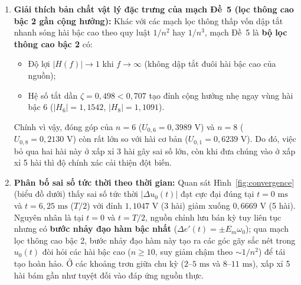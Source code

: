 \begin{enumerate}
    \item \textbf{Giải thích bản chất vật lý đặc trưng của mạch Đề~5 (lọc thông cao bậc 2 gần cộng hưởng):}
    Khác với các mạch lọc thông thấp vốn dập tắt nhanh sóng hài bậc cao theo quy luật $1/n^2$ hay $1/n^3$, mạch Đề~5 là \textbf{bộ lọc thông cao bậc 2} có:
    \begin{itemize}
        \item Độ lợi $|H(f)| \to 1$ khi $f \to \infty$ (không dập tắt đuôi hài bậc cao của nguồn);
        \item Hệ số tắt dần $\zeta = 0{,}498 < 0{,}707$ tạo đỉnh cộng hưởng nhẹ ngay vùng hài bậc 6 ($|H_6| = 1{,}1542$, $|H_8| = 1{,}1091$).
    \end{itemize}
    Chính vì vậy, đóng góp của $n = 6$ ($U_{0,6} = 0{,}3989\text{ V}$) và $n = 8$ ($U_{0,8} = 0{,}2130\text{ V}$) còn rất lớn so với hài cơ bản ($U_{0,1} = 0{,}6239\text{ V}$). Do đó, việc bỏ qua hai hài này ở xấp xỉ 3 hài gây sai số lớn, còn khi đưa chúng vào ở xấp xỉ 5 hài thì độ chính xác cải thiện đột biến.

    \item \textbf{Phân bố sai số tức thời theo thời gian:}
    Quan sát Hình~\ref{fig:convergence} (biểu đồ dưới) thấy sai số tức thời $|\Delta u_0(t)|$ đạt cực đại đúng tại $t = 0\text{ ms}$ và $t = 6{,}25\text{ ms}$ ($T/2$) với đỉnh $1{,}1047\text{ V}$ (3 hài) giảm xuống $0{,}6669\text{ V}$ (5 hài). Nguyên nhân là tại $t = 0$ và $t = T/2$, nguồn chỉnh lưu bán kỳ tuy liên tục nhưng có \textbf{bước nhảy đạo hàm bậc nhất} ($\Delta e'(t) = \pm E_m\omega_0$); qua mạch lọc thông cao bậc 2, bước nhảy đạo hàm này tạo ra các góc gãy sắc nét trong $u_0(t)$ đòi hỏi các hài bậc cao ($n \ge 10$, suy giảm chậm theo $\sim 1/n^2$) để tái tạo hoàn hảo. Ở các khoảng trơn giữa chu kỳ ($2\text{--}5\text{ ms}$ và $8\text{--}11\text{ ms}$), xấp xỉ 5 hài bám gần như tuyệt đối vào đáp ứng nguồn thực.
\end{enumerate}
